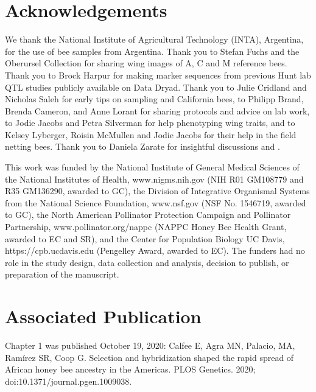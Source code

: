 \section*{Acknowledgements}
We thank the National Institute of Agricultural Technology (INTA), Argentina, for the use of bee samples from Argentina. Thank you to Stefan Fuchs and the Oberursel Collection for sharing wing images of A, C and M reference bees. Thank you to Brock Harpur for making marker sequences from previous Hunt lab QTL studies publicly available on Data Dryad. Thank you to Julie Cridland and Nicholas Saleh for early tips on sampling and California bees, to Philipp Brand, Brenda Cameron, and Anne Lorant for sharing protocols and advice on lab work, to Jodie Jacobs and Petra Silverman for help phenotyping wing traits, and to Kelsey Lyberger, Roisin McMullen and Jodie Jacobs for their help in the field netting bees.  Thank you to Daniela Zarate for insightful discussions and .

This work was funded by the National Institute of General Medical Sciences of the National Institutes of Health, www.nigms.nih.gov (NIH R01 GM108779 and R35 GM136290, awarded to GC), the Division of Integrative Organismal Systems from the National Science Foundation, www.nsf.gov (NSF No. 1546719, awarded to GC), the North American Pollinator Protection Campaign and Pollinator Partnership, www.pollinator.org/nappc (NAPPC Honey Bee Health Grant, awarded to EC and SR), and the Center for Population Biology UC Davis, https://cpb.ucdavis.edu (Pengelley Award, awarded to EC). The funders had no role in the study design, data collection and analysis, decision to publish, or preparation of the manuscript.

\section*{Associated Publication}
Chapter 1 was published October 19, 2020: \newline
Calfee E, Agra MN, Palacio, MA, Ramírez SR, Coop G. Selection and hybridization shaped the rapid spread of African honey bee ancestry in the Americas. PLOS Genetics. 2020; \\doi:10.1371/journal.pgen.1009038.

